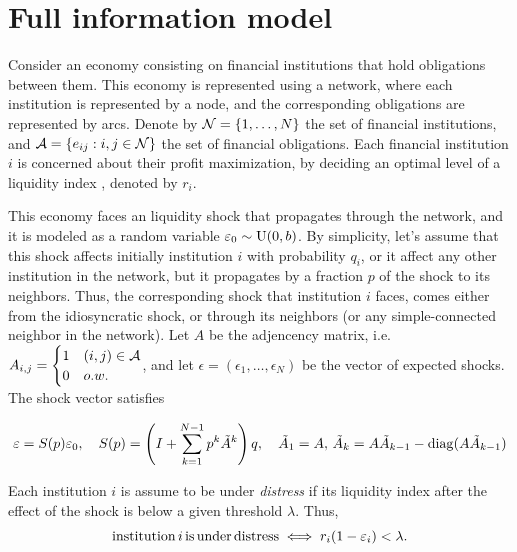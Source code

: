 \section{Full information model}
Consider an economy consisting on financial institutions that hold obligations between them.  This economy is represented using a network, where each institution is represented by a node, and the corresponding obligations are represented by arcs.  Denote by $\cN=\{1,\ldots,N\}$ the set of financial institutions, and $\cA=\{e_{ij}:i,j\in\cN\}$ the set of financial obligations.  Each financial institution $i$ is concerned about their profit maximization,  by deciding an optimal level of a liquidity index , denoted by $r_i$.

This economy faces an liquidity shock that propagates through the network, and it is modeled as a random variable $\epsilon_0\sim{\rm U}(0,b)$.  By simplicity, let's assume that this shock affects initially institution $i$ with probability $q_i$, or it affect any other institution in the network, but it propagates by a fraction $p$ of the shock to its neighbors.  Thus, the corresponding shock that institution $i$ faces, comes either from the idiosyncratic shock, or through its neighbors (or any simple-connected neighbor in the network).  Let $A$ be the adjencency matrix, i.e. $A_{i,j} = \begin{cases} 1 & (i,j)\in\cA\\ 0 &o.w.\end{cases}$, and let $\epsilon=(\epsilon_1,\ldots,\epsilon_N)$ be the vector of expected shocks.  The shock vector satisfies

\begin{equation}\label{eps}
\epsilon = S(p)\epsilon_0,\quad S(p)=\left(I +\sum_{k=1}^{N-1}p^k\tilde{A}^k\right)q,\quad \tilde{A}_1=A,\,\tilde{A}_k = A\tilde{A}_{k-1}-{\rm diag}(A\tilde{A}_{k-1})
\end{equation}

Each institution $i$ is assume to be under \emph{distress} if its liquidity index after the effect of the shock is below a given threshold $\lambda$.  Thus,
\begin{equation}\label{distress}
{\rm institution}\,i\,{\rm is\,under\,distress} \iff r_i(1-\epsilon_i) < \lambda.
\end{equation}

